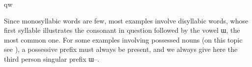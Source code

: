 qw\documentclass[oldfontcommands,oneside,a4paper,11pt]{article}
\newcommand{\ipa}[1]{{\phon #1}} %
\begin{document}
Since monosyllabic words are few,  most examples involve disyllabic words, whose first syllable illustrates the consonant in question followed by the vowel \ipa{ɯ}, the most common one. For some examples involving possessed nouns (on this topic see \citealt[6]{jacques14antipassive}), a possessive prefix must always be present, and we always give here the third person singular prefix  \ipa{ɯ--}.
 
 \begin{table}
 \caption{Consonantal phonemes in Japhug Rgyalrong} \label{tab:consonants}
\end{table}
\end{document}
